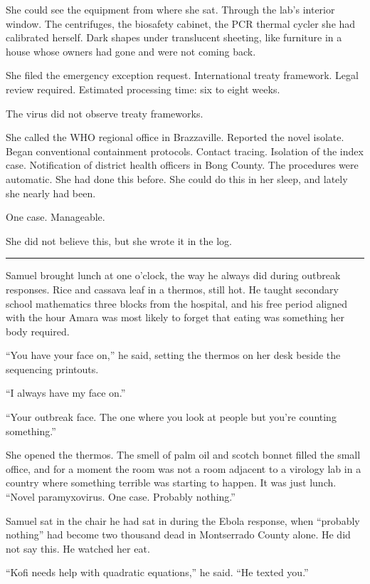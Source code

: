 \documentclass[11pt]{article}
\begin{document}
She could see the equipment from where she sat. Through the lab's interior window. The centrifuges, the biosafety cabinet, the PCR thermal cycler she had calibrated herself. Dark shapes under translucent sheeting, like furniture in a house whose owners had gone and were not coming back.

She filed the emergency exception request. International treaty framework. Legal review required. Estimated processing time: six to eight weeks.

The virus did not observe treaty frameworks.

She called the WHO regional office in Brazzaville. Reported the novel isolate. Began conventional containment protocols. Contact tracing. Isolation of the index case. Notification of district health officers in Bong County. The procedures were automatic. She had done this before. She could do this in her sleep, and lately she nearly had been.

One case. Manageable.

She did not believe this, but she wrote it in the log.

\begin{center}\rule{0.3\linewidth}{0.4pt}\end{center}

Samuel brought lunch at one o'clock, the way he always did during outbreak responses. Rice and cassava leaf in a thermos, still hot. He taught secondary school mathematics three blocks from the hospital, and his free period aligned with the hour Amara was most likely to forget that eating was something her body required.

``You have your face on,'' he said, setting the thermos on her desk beside the sequencing printouts.

``I always have my face on.''

``Your outbreak face. The one where you look at people but you're counting something.''

She opened the thermos. The smell of palm oil and scotch bonnet filled the small office, and for a moment the room was not a room adjacent to a virology lab in a country where something terrible was starting to happen. It was just lunch. ``Novel paramyxovirus. One case. Probably nothing.''

Samuel sat in the chair he had sat in during the Ebola response, when ``probably nothing'' had become two thousand dead in Montserrado County alone. He did not say this. He watched her eat.

``Kofi needs help with quadratic equations,'' he said. ``He texted you.''
\end{document}
